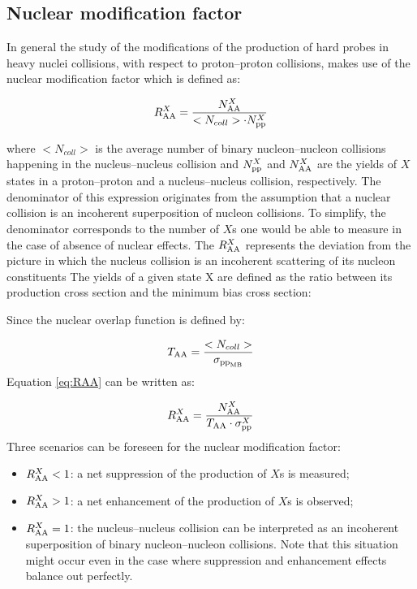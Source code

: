 \subsection{Nuclear modification factor}\label{RAA}
In general the study of the modifications of the production of hard probes in heavy nuclei collisions, with respect to proton--proton collisions, makes use of the nuclear modification factor which is defined as:

\begin{equation}
\label{eq:RAA}
R_{\rm{AA}}^X = \frac{N_{\rm{AA}}^X}{<N_{coll}>\cdot N_{\rm{pp}}^X}
\end{equation}

where $<N_{coll}>$ is the average number of binary nucleon--nucleon collisions happening in the nucleus--nucleus collision and $N_{\rm{pp}}^X$ and $N_{\rm{AA}}^X$ are the yields of $X$ states in a proton--proton and a nucleus--nucleus collision, respectively.
The denominator of this expression originates from the assumption that a nuclear collision is an incoherent superposition of nucleon collisions.
To simplify, the denominator corresponds to the number of $X$s one would be able to measure in the case of absence of nuclear effects.
The $R_{\rm{AA}}^X$ represents the deviation from the picture in which the nucleus collision is an incoherent scattering of its nucleon constituents
The yields of a given state X are defined as the ratio between its production cross section and the minimum bias cross section:


Since the nuclear overlap function is defined by:

\begin{equation}
\label{eq:TAA}
T_{\rm{AA}} = \frac{<N_{coll}>}{\sigma_{\rm{pp}_{MB}}}
\end{equation}
Equation \ref{eq:RAA} can be written as:

\begin{equation}
\label{eq:RAA2}
R_{\rm{AA}}^X = \frac{N_{\rm{AA}}^X}{T_{\rm{AA}} \cdot \sigma_{\rm{pp}}^X}
\end{equation}
Three scenarios can be foreseen for the nuclear modification factor:
\begin{itemize}
\item $R_{\rm{AA}}^X<1$: a net suppression of the production of $X$s is measured;
\item $R_{\rm{AA}}^X>1$: a net enhancement of the production of $X$s is observed; 
\item $R_{\rm{AA}}^X=1$: the nucleus--nucleus collision can be interpreted as an incoherent superposition of binary nucleon--nucleon collisions. Note that this situation might occur even in the case where suppression and enhancement effects balance out perfectly.
\end{itemize}

